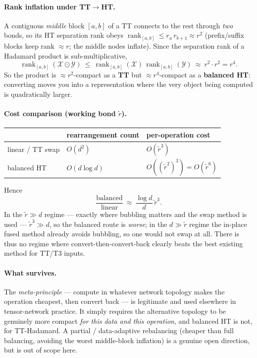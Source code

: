 \documentclass[11pt]{article}
\newcommand{\X}{\mathcal{X}}
\newcommand{\Y}{\mathcal{Y}}
\newcommand{\had}{\odot}                     %
\newcommand{\rtil}{\tilde{r}}
\DeclareMathOperator{\rank}{rank}
\begin{document}
\paragraph{Rank inflation under TT$\to$HT.}
A contiguous \emph{middle} block $[a,b]$ of a TT connects to the rest through
\emph{two} bonds, so its HT separation rank obeys
$\rank_{[a,b]}\le r_a\,r_{b+1}\approx r^2$ (prefix/suffix blocks keep rank
$\approx r$; the middle nodes inflate). Since the separation rank of a Hadamard
product is sub-multiplicative,
\[
\rank_{[a,b]}(\X\had\Y)\ \le\ \rank_{[a,b]}(\X)\,\rank_{[a,b]}(\Y)\ \approx\ r^2\cdot r^2 = r^4 .
\]
So the product is $\approx r^2$-compact as a \textbf{TT} but $\approx r^4$-compact
as a \textbf{balanced HT}: converting moves you into a representation where the very
object being computed is quadratically larger.

\paragraph{Cost comparison (working bond $\rtil$).}
\begin{center}
\begin{tabular}{lll}
\toprule
 & rearrangement count & per-operation cost \\
\midrule
linear / TT swap & $O(d^2)$ & $O(\rtil^3)$ \\
balanced HT & $O(d\log d)$ & $O((\rtil^2)^3)=O(\rtil^6)$ \\
\bottomrule
\end{tabular}
\end{center}
Hence
\[
\frac{\text{balanced}}{\text{linear}}\ \approx\ \frac{\log d}{d}\,\rtil^3 .
\]
In the $\rtil\gg d$ regime --- exactly where bubbling matters and the swap method is
used --- $\rtil^3\gg d$, so the balanced route is \emph{worse}; in the $d\gg\rtil$
regime the in-place fused method already avoids bubbling, so one would not swap at
all. There is thus no regime where convert-then-convert-back clearly beats the best
existing method for TT/T3 inputs.

\paragraph{What survives.}
The \emph{meta-principle} --- compute in whatever network topology makes the
operation cheapest, then convert back --- is legitimate and used elsewhere in
tensor-network practice. It simply requires the alternative topology to be
genuinely more compact \emph{for this data and this operation}, and balanced HT is
not, for TT-Hadamard. A partial / data-adaptive rebalancing (cheaper than full
balancing, avoiding the worst middle-block inflation) is a genuine open direction,
but is out of scope here.
\end{document}
